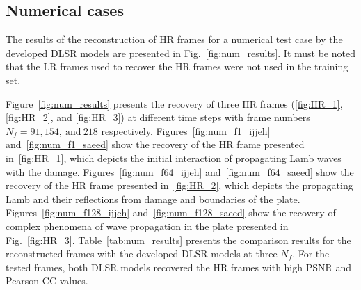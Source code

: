 \subsection{Numerical cases}
The results of the reconstruction of HR frames for a numerical test case by the developed DLSR models are presented in Fig.~\ref{fig:num_results}.
It must be noted that the LR frames used to recover the HR frames were not used in the training set.

Figure~\ref{fig:num_results} presents the recovery of three HR frames (\ref{fig:HR_1}, \ref{fig:HR_2}, and \ref{fig:HR_3}) at different time steps with frame numbers \(N_f=91, 154,\ \text{and}\ 218\) respectively.
Figures~\ref{fig:num_f1_ijjeh} and~\ref{fig:num_f1_saeed} show the recovery of the HR frame presented in~\ref{fig:HR_1}, which depicts the initial interaction of propagating Lamb waves with the damage.
Figures~\ref{fig:num_f64_ijjeh} and~\ref{fig:num_f64_saeed} show the recovery of the HR frame presented in~\ref{fig:HR_2}, which depicts the propagating Lamb and their reflections from damage and boundaries of the plate.
Figures~\ref{fig:num_f128_ijjeh} and~\ref{fig:num_f128_saeed} show the recovery of complex phenomena of wave propagation in the plate presented in Fig.~\ref{fig:HR_3}.
Table~\ref{tab:num_results} presents the comparison results for the reconstructed frames with the developed DLSR models at three $N_f$.
For the tested frames, both DLSR models recovered the HR frames with high PSNR and Pearson CC values.
